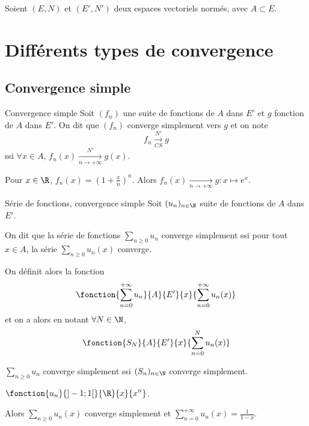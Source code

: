 Soient $(E, N)$ et $(E', N')$ deux espaces vectoriels normés, avec 
$A \subset E$.

\section{Différents types de convergence}
\subsection{Convergence simple }

\begin{definition}{Convergence simple}{}
    Soit $(f_n)$ une suite de fonctions de $A$ dans $E'$ et $g$ fonction de $A$ dans $E'$. 
    On dit que $(f_n)$ converge simplement vers $g$ et on note 
    \[
        f_n \xrightarrow[CS]{N'} g 
    \]
    ssi $\forall x \in A, \, f_n(x) \xrightarrow[n\to +\infty]{N'} g(x)$.
\end{definition}

\begin{exemple}
    Pour $x \in \R$, $f_n(x) = \left( 1 + \frac x n \right)^n$.
    Alors $f_n(x) \xrightarrow[n\to +\infty]{} g : x \mapsto e^x$.
\end{exemple}

\begin{definition}{Série de fonctions, convergence simple}{}
    Soit $(u_n)_{n \in \N}$ suite de fonctions de $A$ dans $E'$.

    On dit que la série de fonctions $\displaystyle \sum_{n \geqslant 0} u_n$ converge simplement 
    ssi pour tout $x \in A$, la série $\displaystyle \sum_{n \geqslant 0} u_n(x)$ converge.

    On définit alors la fonction 
    \[
        \fonction{\sum_{n = 0 }^{ + \infty } u_n }{A}{E'}{x}{\sum_{n = 0}^{ + \infty } u_n(x)}
    \]
    et on a alors en notant $\forall N \in \N$, $$\fonction{S_N}{A}{E'}{x}{\sum_{n = 0}^N u_n(x)}$$

    $\displaystyle \sum_{n \geqslant 0} u_n$ converge simplement ssi $(S_n)_{n \in \N}$ converge simplement.

\end{definition}

\begin{exemple}
    $\displaystyle \fonction{u_n}{]-1; 1[}{\R}{x}{x^n}$.

    Alors $\displaystyle \sum_{n \geqslant 0} u_n(x)$ converge simplement et $\displaystyle \sum_{n = 0}^{ + \infty } u_n(x) = \frac{1}{1-x}$.
\end{exemple}


